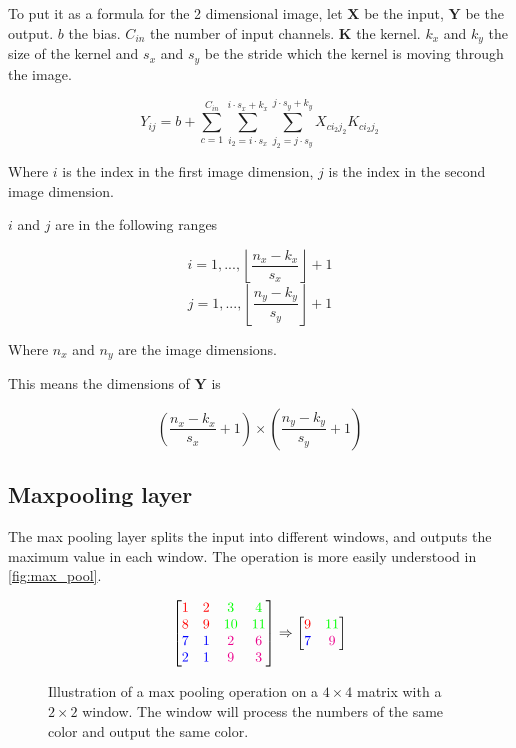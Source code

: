 To put it as a formula for the 2 dimensional image,
let $\bm{X}$ be the input,
$\bm{Y}$ be the output.
$b$ the bias.
$C_{in}$ the number of input channels.
$\bm{K}$ the kernel.
$k_x$ and $k_y$ the size of the kernel and $s_x$ and $s_y$ be the stride which the kernel is moving through the image.

$$Y_{ij} = b + \sum^{C_{in}}_{c = 1} \sum^{i \cdot s_x + k_x}_{i_2 = i \cdot s_x} \sum^{j \cdot s_y + k_y}_{j_2 = j \cdot s_y} X_{ci_2j_2} K_{ci_2j_2} $$

Where $i$ is the index in the first image dimension, $j$ is the index in the second image dimension.

$i$ and $j$ are in the following ranges

$$i = 1, ..., \left\lfloor\frac{n_x - k_x}{s_x}\right\rfloor + 1$$
$$j = 1, ..., \left\lfloor\frac{n_y - k_y}{s_y}\right\rfloor + 1$$

Where $n_x$ and $n_y$ are the image dimensions.

This means the dimensions of $\bm{Y}$ is

$$\left(\frac{n_x - k_x}{s_x} + 1\right) \times \left(\frac{n_y - k_y}{s_y} + 1\right) $$

\subsection{Maxpooling layer}

The max pooling layer splits the input into different windows, and outputs the maximum value in each window. The operation is more easily understood in \autoref{fig:max_pool}.

\begin{figure}[htpb]
    \centering
    $$\begin{bmatrix}
        \color{red}1 & \color{red} 2 & \color{green} 3 & \color{green} 4 \\
        \color{red}8 & \color{red}9 & \color{green}10 & \color{green}11 \\
        \color{blue}7 & \color{blue}1 & \color{magenta}2 & \color{magenta}6 \\
        \color{blue}2 & \color{blue}1 & \color{magenta}9 & \color{magenta}3
        \end{bmatrix} \Rightarrow \begin{bmatrix}
        \color{red}9 & \color{green}11 \\
        \color{blue}7 & \color{magenta}9
        \end{bmatrix}$$
    \caption{Illustration of a max pooling operation on a $4\times 4$ matrix with a $2\times 2$ window. The window will process the numbers of the same color and output the same color.}
    \label{fig:max_pool}
\end{figure}

